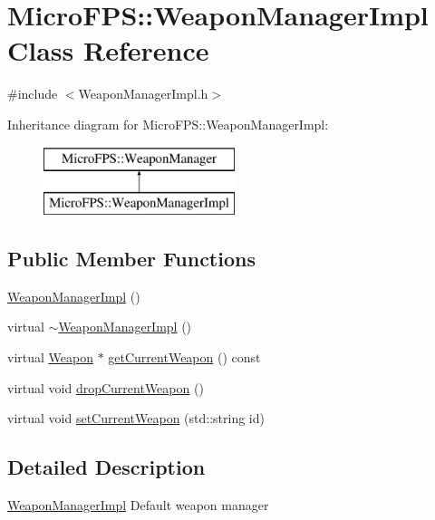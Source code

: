 \hypertarget{class_micro_f_p_s_1_1_weapon_manager_impl}{
\section{MicroFPS::WeaponManagerImpl Class Reference}
\label{d0/da3/class_micro_f_p_s_1_1_weapon_manager_impl}
}


{\ttfamily \#include $<$WeaponManagerImpl.h$>$}

Inheritance diagram for MicroFPS::WeaponManagerImpl:\begin{figure}[H]
\begin{center}
\leavevmode
\includegraphics[height=2.000000cm]{d0/da3/class_micro_f_p_s_1_1_weapon_manager_impl}
\end{center}
\end{figure}
\subsection*{Public Member Functions}
\begin{DoxyCompactItemize}
\item 
\hyperlink{class_micro_f_p_s_1_1_weapon_manager_impl_a88433e44afc92c71c0c1a9ed1f48bf82}{WeaponManagerImpl} ()
\item 
virtual \hyperlink{class_micro_f_p_s_1_1_weapon_manager_impl_aa7ec7f024df54357be5ea45ff4ed7bb4}{$\sim$WeaponManagerImpl} ()
\item 
virtual \hyperlink{class_micro_f_p_s_1_1_weapon}{Weapon} $\ast$ \hyperlink{class_micro_f_p_s_1_1_weapon_manager_impl_a3c8963d52953b5f4dd0d6bc676d41109}{getCurrentWeapon} () const 
\item 
virtual void \hyperlink{class_micro_f_p_s_1_1_weapon_manager_impl_a6f0fb8552dc933c281a2182224fa685b}{dropCurrentWeapon} ()
\item 
virtual void \hyperlink{class_micro_f_p_s_1_1_weapon_manager_impl_a1e1d757ee4ab07289dcfb6842b337c42}{setCurrentWeapon} (std::string id)
\end{DoxyCompactItemize}


\subsection{Detailed Description}
\hyperlink{class_micro_f_p_s_1_1_weapon_manager_impl}{WeaponManagerImpl} Default weapon manager 


